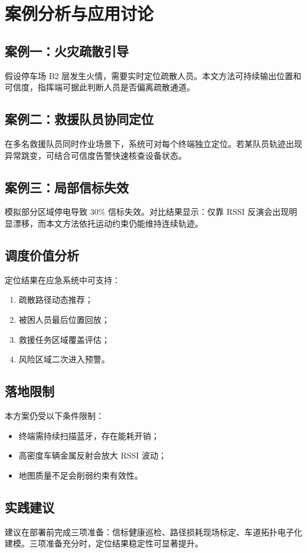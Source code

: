 \chapter{案例分析与应用讨论}

\section{案例一：火灾疏散引导}
假设停车场 B2 层发生火情，需要实时定位疏散人员。本文方法可持续输出位置和可信度，指挥端可据此判断人员是否偏离疏散通道。

\section{案例二：救援队员协同定位}
在多名救援队员同时作业场景下，系统可对每个终端独立定位。若某队员轨迹出现异常跳变，可结合可信度告警快速核查设备状态。

\section{案例三：局部信标失效}
模拟部分区域停电导致 30\% 信标失效。对比结果显示：仅靠 RSSI 反演会出现明显漂移，而本文方法依托运动约束仍能维持连续轨迹。

\section{调度价值分析}
定位结果在应急系统中可支持：
\begin{enumerate}
  \item 疏散路径动态推荐；
  \item 被困人员最后位置回放；
  \item 救援任务区域覆盖评估；
  \item 风险区域二次进入预警。
\end{enumerate}

\section{落地限制}
本方案仍受以下条件限制：
\begin{itemize}
  \item 终端需持续扫描蓝牙，存在能耗开销；
  \item 高密度车辆金属反射会放大 RSSI 波动；
  \item 地图质量不足会削弱约束有效性。
\end{itemize}

\section{实践建议}
建议在部署前完成三项准备：信标健康巡检、路径损耗现场标定、车道拓扑电子化建模。三项准备充分时，定位结果稳定性可显著提升。
